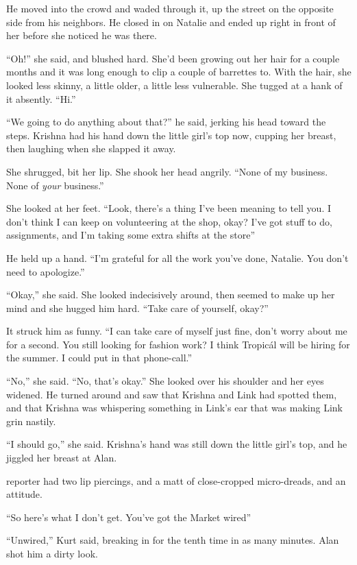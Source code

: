 He moved into the crowd and waded through it, up the street on the
opposite side from his neighbors.  He closed in on Natalie and ended
up right in front of her before she noticed he was there.

``Oh!'' she said, and blushed hard.  She'd been growing out her hair
for a couple months and it was long enough to clip a couple of
barrettes to.  With the hair, she looked less skinny, a little older,
a little less vulnerable.  She tugged at a hank of it absently. 
``Hi.''

``We going to do anything about that?'' he said, jerking his head
toward the steps.  Krishna had his hand down the little girl's top
now, cupping her breast, then laughing when she slapped it away.

She shrugged, bit her lip.  She shook her head angrily.  ``None of my
business.  None of \textit{your} business.''

She looked at her feet.  ``Look, there's a thing I've been meaning to
tell you.  I don't think I can keep on volunteering at the shop, okay? 
I've got stuff to do, assignments, and I'm taking some extra shifts at
the store\dash{}''

He held up a hand.  ``I'm grateful for all the work you've done,
Natalie.  You don't need to apologize.''

``Okay,'' she said.  She looked indecisively around, then seemed to
make up her mind and she hugged him hard.  ``Take care of yourself,
okay?''

It struck him as funny.  ``I can take care of myself just fine, don't
worry about me for a second.  You still looking for fashion work?  I
think Tropic\'{a}l will be hiring for the summer.  I could put in that
phone-call.''

``No,'' she said.  ``No, that's okay.'' She looked over his shoulder
and her eyes widened.  He turned around and saw that Krishna and Link
had spotted them, and that Krishna was whispering something in Link's
ear that was making Link grin nastily.

``I should go,'' she said.  Krishna's hand was still down the little
girl's top, and he jiggled her breast at Alan.

 reporter had two lip piercings, and a matt of close-cropped
micro-dreads, and an attitude.

``So here's what I don't get.  You've got the Market wired\dash{}''

``Unwired,'' Kurt said, breaking in for the tenth time in as many
minutes.  Alan shot him a dirty look.

